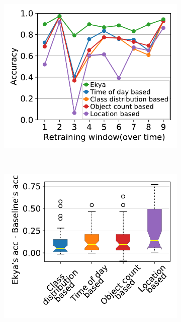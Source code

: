 \begin{figure}[t]
\captionsetup[subfigure]{justification=centering}
  \centering
  \begin{subfigure}[t]{0.48\linewidth}
    \centering
    \includegraphics[width=\linewidth]{ekya/results/reuse_cached_model/new_sf_060_069_golden_label.pdf}
    \caption{\small {}}
    \label{fig:reuse-cached-model-1}
  \end{subfigure}
  ~
  \begin{subfigure}[t]{0.48\linewidth}
    \centering
    \includegraphics[width=\linewidth]{ekya/results/reuse_cached_model/new_waymo_reuse_cached_model_boxplot.pdf} 

\end{subfigure}
\end{figure}
